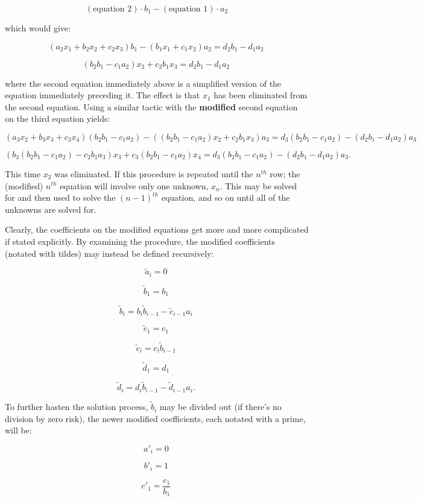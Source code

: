 \documentclass[]{article}
\begin{document}
\[(\mbox{equation 2}) \cdot b_1 - (\mbox{equation 1}) \cdot a_2\]

which would give:

\[(a_2 x_1 + b_2 x_2  + c_2 x_3) b_1 - (b_1 x_1  + c_1 x_2) a_2 = d_2 b_1 - d_1 a_2
\,\]

\[(b_2 b_1 - c_1 a_2) x_2  + c_2 b_1 x_3 = d_2 b_1 - d_1 a_2
\,\]

where the second equation immediately above is a simplified version of
the equation immediately preceding it. The effect is that \(x_1\) has
been eliminated from the second equation. Using a similar tactic with
the \textbf{modified} second equation on the third equation yields:

\[(a_3 x_2 + b_3 x_3 + c_3 x_4) (b_2 b_1 - c_1 a_2) -
((b_2 b_1 - c_1 a_2) x_2 + c_2 b_1 x_3) a_3
= d_3 (b_2 b_1 - c_1 a_2) - (d_2 b_1 - d_1 a_2) a_3
\,\]

\[(b_3 (b_2 b_1 - c_1 a_2) - c_2 b_1 a_3 )x_3 + c_3 (b_2 b_1 - c_1 a_2) x_4
= d_3 (b_2 b_1 - c_1 a_2) - (d_2 b_1 - d_1 a_2) a_3.
\,\]

This time \(x_2\) was eliminated. If this procedure is repeated until
the \(n^{th}\) row; the (modified) \(n^{th}\) equation will involve only
one unknown, \(x_n\). This may be solved for and then used to solve the
\((n - 1)^{th}\) equation, and so on until all of the unknowns are
solved for.

Clearly, the coefficients on the modified equations get more and more
complicated if stated explicitly. By examining the procedure, the
modified coefficients (notated with tildes) may instead be defined
recursively:

\[\tilde a_i = 0\,\]

\[\tilde b_1 = b_1\,\]

\[\tilde b_i = b_i \tilde b_{i - 1} - \tilde c_{i - 1} a_i\,\]

\[\tilde c_1 = c_1\,\]

\[\tilde c_i = c_i \tilde b_{i - 1}\,\]

\[\tilde d_1 = d_1\,\]

\[\tilde d_i = d_i \tilde b_{i - 1} - \tilde d_{i - 1} a_i.\,\]

To further hasten the solution process, \(\tilde b_i\) may be divided
out (if there's no division by zero risk), the newer modified
coefficients, each notated with a prime, will be:

\[a'_i = 0\,\]

\[b'_i = 1\,\]

\[c'_1 = \frac{c_1}{b_1}\,\]
\end{document}
